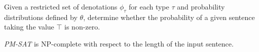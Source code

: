 \documentclass[manuscript]{clv2}
\newcommand{\interp}[1]{[\![ #1 ]\!]}
\begin{document}
\begin{definition}[PM-SAT]

  Given 
  a restricted set of
  denotations $\phi_\tau$ for each type $\tau$ and probability
  distributions defined by $\theta$, determine whether the probability
  of a given sentence taking the value $\top$ is non-zero.
\end{definition}

\begin{theorem}
  \emph{PM-SAT} is NP-complete with respect to the length of the input
  sentence.
\end{theorem}

\end{document}
